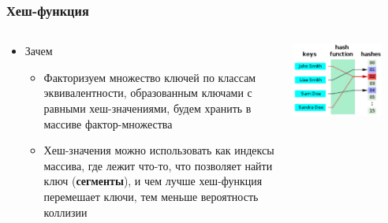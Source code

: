\documentclass[xetex,mathserif,serif]{beamer}
\begin{document}
	\begin{frame}
		\frametitle{Хеш-функция}
		\begin{columns}
			\begin{column}{0.6\textwidth}
				\begin{itemize}
					\item Зачем
					\begin{itemize}
						\item Факторизуем множество ключей по классам эквивалентности, образованным ключами с равными хеш-значениями, будем хранить в массиве фактор-множества
						\item Хеш-значения можно использовать как индексы массива, где лежит что-то, что позволяет найти ключ (\textbf{сегменты}), и чем лучше хеш-функция перемешает ключи, тем меньше вероятность коллизии
					\end{itemize}
				\end{itemize}
			\end{column}
			\begin{column}{0.4\textwidth}
				\begin{center}
					\includegraphics[width=0.8\textwidth]{hashFunction.png}
				\end{center}
			\end{column}
		\end{columns}
	\end{frame}
\end{document}
